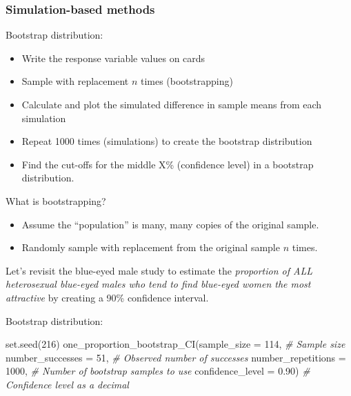 \documentclass[
]{report}
\newenvironment{Shaded}{\begin{snugshade}}{\end{snugshade}}
\newcommand{\AttributeTok}[1]{\textcolor[rgb]{0.77,0.63,0.00}{#1}}
\newcommand{\CommentTok}[1]{\textcolor[rgb]{0.56,0.35,0.01}{\textit{#1}}}
\newcommand{\DecValTok}[1]{\textcolor[rgb]{0.00,0.00,0.81}{#1}}
\newcommand{\FloatTok}[1]{\textcolor[rgb]{0.00,0.00,0.81}{#1}}
\newcommand{\FunctionTok}[1]{\textcolor[rgb]{0.00,0.00,0.00}{#1}}
\newcommand{\NormalTok}[1]{#1}
\begin{document}

\hypertarget{simulation-based-methods}{%
\subsubsection*{Simulation-based methods}\label{simulation-based-methods}}

Bootstrap distribution:

\begin{itemize}
\item
  Write the response variable values on cards
\item
  Sample with replacement \(n\) times (bootstrapping)
\item
  Calculate and plot the simulated difference in sample means from each simulation
\item
  Repeat 1000 times (simulations) to create the bootstrap distribution
\item
  Find the cut-offs for the middle X\% (confidence level) in a bootstrap distribution.
\end{itemize}

What is bootstrapping?

\begin{itemize}
\item
  Assume the ``population'' is many, many copies of the original sample.
\item
  Randomly sample with replacement from the original sample \(n\) times.
\end{itemize}

\newpage

Let's revisit the blue-eyed male study to estimate the \emph{proportion of ALL heterosexual blue-eyed males who tend to find blue-eyed women the most attractive} by creating a 90\% confidence interval.

Bootstrap distribution:

\begin{Shaded}
\begin{Highlighting}[]
\FunctionTok{set.seed}\NormalTok{(}\DecValTok{216}\NormalTok{)}
\FunctionTok{one\_proportion\_bootstrap\_CI}\NormalTok{(}\AttributeTok{sample\_size =} \DecValTok{114}\NormalTok{, }\CommentTok{\# Sample size}
                    \AttributeTok{number\_successes =} \DecValTok{51}\NormalTok{, }\CommentTok{\# Observed number of successes}
                    \AttributeTok{number\_repetitions =} \DecValTok{1000}\NormalTok{, }\CommentTok{\# Number of bootstrap samples to use}
                    \AttributeTok{confidence\_level =} \FloatTok{0.90}\NormalTok{) }\CommentTok{\# Confidence level as a decimal}
\end{Highlighting}
\end{Shaded}
\end{document}
